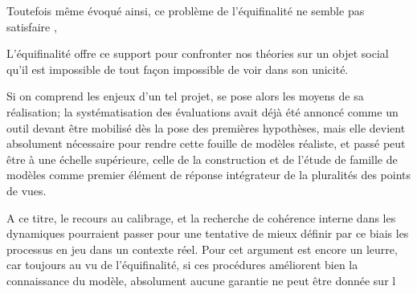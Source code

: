 Toutefois même évoqué ainsi, ce problème de l'équifinalité ne semble pas satisfaire \textcite{Conte2007}, 







L'équifinalité offre ce support pour confronter nos théories sur un objet social qu'il est impossible de tout façon impossible de voir dans son unicité.


Si on comprend les enjeux d'un tel projet, se pose alors les moyens de sa réalisation; la systématisation des évaluations avait déjà été annoncé comme un outil devant être mobilisé dès la pose des premières hypothèses, mais elle devient absolument nécessaire pour rendre cette fouille de modèles réaliste, et passé peut être à une échelle supérieure, celle de la construction et de l'étude de famille de modèles comme premier élément de réponse intégrateur de la pluralités des points de vues.

A ce titre, le recours au calibrage, et la recherche de cohérence interne dans les dynamiques pourraient passer pour une tentative de mieux définir par ce biais les processus en jeu dans un contexte réel. Pour \autocite{OSullivan2004} cet argument est encore un leurre, car toujours au vu de l'équifinalité, si ces procédures améliorent bien la connaissance du modèle, absolument aucune garantie ne peut être donnée sur l